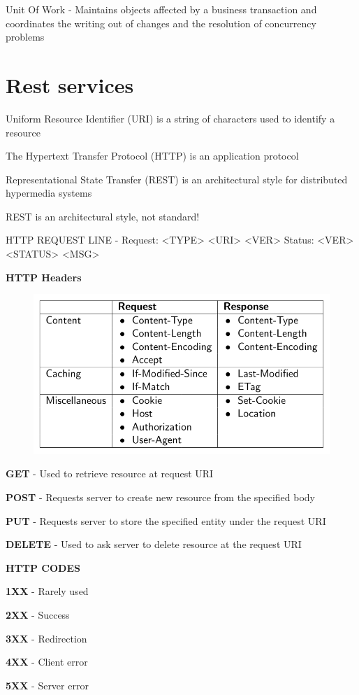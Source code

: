 Unit Of Work - Maintains objects affected by a business transaction and coordinates the writing out of changes and the resolution of concurrency problems

\section{Rest services}
Uniform Resource Identifier (URI) is a string of characters used to identify a resource 

The Hypertext Transfer Protocol (HTTP) is an application protocol

Representational State Transfer (REST) is an architectural style for distributed hypermedia systems

REST is an architectural style, not standard!


HTTP REQUEST LINE - Request: <TYPE> <URI> <VER> \newline Status: <VER> <STATUS> <MSG>

\textbf{HTTP Headers}
\begin{figure}[ht!]
\centering
\includegraphics[width=.75\textwidth]{oborove/SWA/img/http_headers.png}
\end{figure}

\textbf{GET} - Used to retrieve resource at request URI

\textbf{POST} - Requests server to create new resource from the specified body

\textbf{PUT} - Requests server to store the specified entity under the request URI

\textbf{DELETE} - Used to ask server to delete resource at the request URI


\textbf{HTTP CODES}

\textbf{1XX} - Rarely used

\textbf{2XX} - Success

\textbf{3XX} - Redirection

\textbf{4XX} - Client error

\textbf{5XX} - Server error

